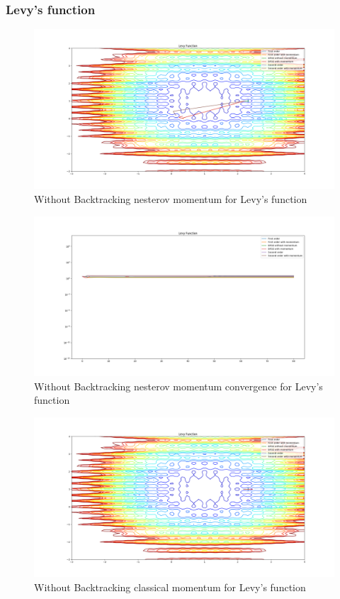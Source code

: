 \documentclass{article}
\begin{document}
\subsubsection{Levy's function}

\begin{figure}[H]
	\includegraphics[width=\linewidth]{../Images/levynesterov.png}
	\caption{Without Backtracking nesterov momentum for Levy's function}
	\label{fig:Without Backtracking nesterov momentum for Levy's function}
\end{figure}

\begin{figure}[H]
	\includegraphics[width=\linewidth]{../Images/levynesterov1.png}
	\caption{Without Backtracking nesterov momentum convergence for Levy's function}
	\label{fig:Without Backtracking nesterov momentum convergence for Levy's function}
\end{figure}

\begin{figure}[H]
	\includegraphics[width=\linewidth]{../Images/levymomentum.png}
	\caption{Without Backtracking classical momentum for Levy's function}
	\label{fig:Without Backtracking classical momentum for Levy's function}
\end{figure}
\end{document}
